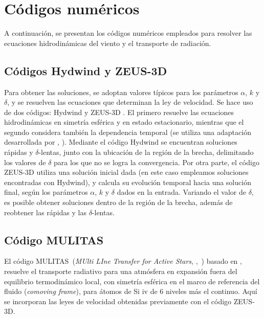 \documentclass[baaa]{baaa}
\begin{document}
\section{C\'odigos num\'ericos}\label{codigos}
A continuaci\'on, se presentan los c\'odigos num\'ericos empleados para resolver las ecuaciones hidrodin\'amicas del viento y el transporte de radiaci\'on.

\subsection{C\'odigos Hydwind y ZEUS-3D}
Para obtener las soluciones, se adoptan valores t\'ipicos para los par\'ametros $\alpha$, $k$ y $\delta$, y se resuelven las ecuaciones que determinan la ley de velocidad. Se hace uso de dos c\'odigos: Hydwind \citep{cure2004} y ZEUS-3D \citep{clarke1996,clarke2010}. El primero resuelve las ecuaciones hidrodin\'amicas en simetr\'ia esf\'erica y en estado estacionario, mientras que el segundo considera tambi\'en la dependencia temporal (se utiliza una adaptaci\'on desarrollada por \citeauthor{araya2018}, \citeyear{araya2018}). Mediante el c\'odigo Hydwind se encuentran soluciones r\'apidas y $\delta$-lentas, junto con la ubicaci\'on de la regi\'on de la brecha, delimitando los valores de $\delta$ para los que no se logra la convergencia. Por otra parte, el c\'odigo ZEUS-3D utiliza una soluci\'on inicial dada (en este caso empleamos soluciones encontradas con Hydwind), y calcula su evoluci\'on temporal hacia una soluci\'on final, seg\'un los par\'ametros $\alpha$, $k$ y $\delta$ dados en la entrada. Variando el valor de $\delta$, es posible obtener soluciones dentro de la regi\'on de la brecha, adem\'as de reobtener las r\'apidas y las $\delta$-lentas.

\subsection{C\'odigo MULITAS}
El c\'odigo MULITAS~(\textit{MUlti LIne Transfer for Active Stars}, \citeauthor{venerocidaleringuelet2000},~\citeyear{venerocidaleringuelet2000}) basado en \citet{mihalaskunasz1978}, resuelve el transporte radiativo para una atm\'osfera en expansi\'on fuera del equilibrio termodinámico local, con simetr\'ia esf\'erica en el marco de referencia del fluido (\textit{comoving frame}), para \'atomos de Si {\sc iv} de 6 niveles m\'as el continuo. Aqu\'i se incorporan las leyes de velocidad obtenidas previamente con el c\'odigo ZEUS-3D.
\end{document}
